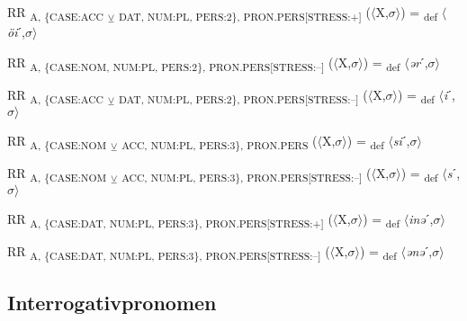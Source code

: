 {\begin{exe}
 RR \textsubscript{A, \{CASE:ACC} \textsubscript{${\veebar}$}\textsubscript{ DAT, NUM:PL, PERS:2\}, PRON.PERS[STRESS:+]} ($\langle$X,$\sigma $$\rangle$) = \textsubscript{def} $\langle$\textit{öi}ˊ,$\sigma $$\rangle$
\end{exe}

\begin{exe}
 RR \textsubscript{A, \{CASE:NOM, NUM:PL, PERS:2\}, PRON.PERS[STRESS:–]} ($\langle$X,$\sigma $$\rangle$) = \textsubscript{def} $\langle$\textit{ər}ˊ,$\sigma $$\rangle$
\end{exe}

\begin{exe}
 RR \textsubscript{A, \{CASE:ACC} \textsubscript{${\veebar}$}\textsubscript{ DAT, NUM:PL, PERS:2\}, PRON.PERS[STRESS:–]} ($\langle$X,$\sigma $$\rangle$) = \textsubscript{def} $\langle$\textit{i}ˊ,$\sigma $$\rangle$
\end{exe}

\begin{exe}
 RR \textsubscript{A, \{CASE:NOM} \textsubscript{${\veebar}$}\textsubscript{ ACC, NUM:PL, PERS:3\}, PRON.PERS} ($\langle$X,$\sigma $$\rangle$) = \textsubscript{def} $\langle$\textit{si}ˊ,$\sigma $$\rangle$
\end{exe}

\begin{exe}
 RR \textsubscript{A, \{CASE:NOM} \textsubscript{${\veebar}$}\textsubscript{ ACC, NUM:PL, PERS:3\}, PRON.PERS[STRESS:–]} ($\langle$X,$\sigma $$\rangle$) = \textsubscript{def} $\langle$\textit{s}ˊ,$\sigma $$\rangle$
\end{exe}

\begin{exe}
 RR \textsubscript{A, \{CASE:DAT, NUM:PL, PERS:3\}, PRON.PERS[STRESS:+]} ($\langle$X,$\sigma $$\rangle$) = \textsubscript{def} $\langle$\textit{inə}ˊ,$\sigma $$\rangle$
\end{exe}

\begin{exe}
 RR \textsubscript{A, \{CASE:DAT, NUM:PL, PERS:3\}, PRON.PERS[STRESS:–]} ($\langle$X,$\sigma $$\rangle$) = \textsubscript{def} $\langle$\textit{ənə}ˊ,$\sigma $$\rangle$
\end{exe}

\subsection{Interrogativpronomen}

}
